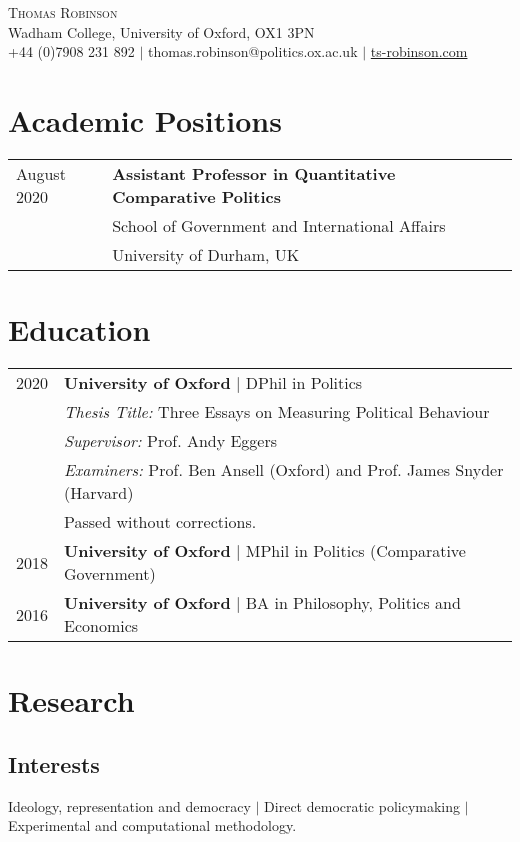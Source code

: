 \documentclass[11pt, a4paper]{article}
\begin{document}
 \begin{center}
    \textsc{\huge Thomas Robinson} \\
    Wadham College, University of Oxford, OX1 3PN \\
    +44 (0)7908 231 892 $|$ thomas.robinson@politics.ox.ac.uk $|$ \href{https://ts-robinson.com}{ts-robinson.com}
 \end{center}

\section*{Academic Positions}
\begin{tabular}{ll}
    August 2020 & \textbf{Assistant Professor in Quantitative Comparative Politics} \\
    & School of Government and International Affairs \\
    & University of Durham, UK \\

 \end{tabular}

 \section*{Education}
 \begin{tabular}{ll}
    2020 & \textbf{University of Oxford} $|$ DPhil in Politics \\
    	 & \textit{Thesis Title:} Three Essays on Measuring Political Behaviour \\
    	 & \textit{Supervisor:} Prof. Andy Eggers\\
    	 & \textit{Examiners:} Prof. Ben Ansell (Oxford) and Prof. James Snyder (Harvard) \\
    	 & Passed without corrections. \\
    2018  & \textbf{University of Oxford} $|$ MPhil in Politics (Comparative Government) \\
    2016 & \textbf{University of Oxford} $|$ BA in Philosophy, Politics and Economics
 \end{tabular}

 \section*{Research}

 \subsection*{Interests}
 Ideology, representation and democracy $|$ Direct democratic policymaking $|$ Experimental and computational methodology.
\end{document}
